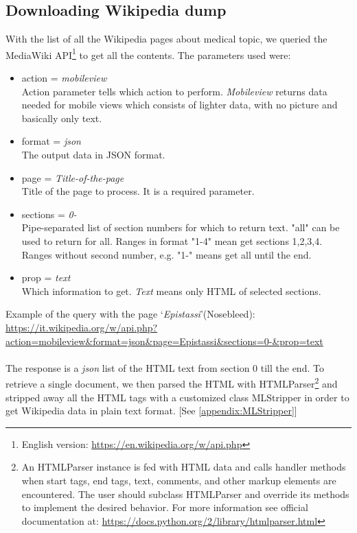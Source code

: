 \subsection{Downloading Wikipedia dump}
With the list of all the Wikipedia pages about medical topic, we queried the MediaWiki API\footnote{English version: \url{https://en.wikipedia.org/w/api.php}} to get all the contents. 
The parameters used were:
\begin{itemize}
	\item action = \textit{mobileview} \\
	Action parameter tells which action to perform. \textit{Mobileview} returns data needed for mobile views which consists of lighter data, with no picture and basically only text.
	\item format = \textit{json} \\
	The output data in JSON format.
	\item page = \textit{Title-of-the-page} \\
	Title of the page to process. It is a required parameter.
	\item sections = \textit{0-} \\
	Pipe-separated list of section numbers for which to return text. "all" can be used to return for all. Ranges in format "1-4" mean get sections 1,2,3,4. Ranges without second number, e.g. "1-" means get all until the end.
	\item prop = \textit{text} \\
	Which information to get. \textit{Text} means only HTML of selected sections.
\end{itemize}
Example of the query with the page \enquote*{\textit{Epistassi}}(Nosebleed):\\
\url{https://it.wikipedia.org/w/api.php?action=mobileview\&format=json\&page=Epistassi\&sections=0-\&prop=text}
\\\\
The response is a \textit{json} list of the HTML text from section 0 till the end. To retrieve a single document, we then parsed the HTML with HTMLParser\footnote{An HTMLParser instance is fed with HTML data and calls handler methods when start tags, end tags, text, comments, and other markup elements are encountered. The user should subclass HTMLParser and override its methods to implement the desired behavior. For more information see official documentation at: \url{https://docs.python.org/2/library/htmlparser.html}} and stripped away all the HTML tags with a customized class MLStripper in order to get Wikipedia data in plain text format. [See \ref{appendix:MLStripper}]


